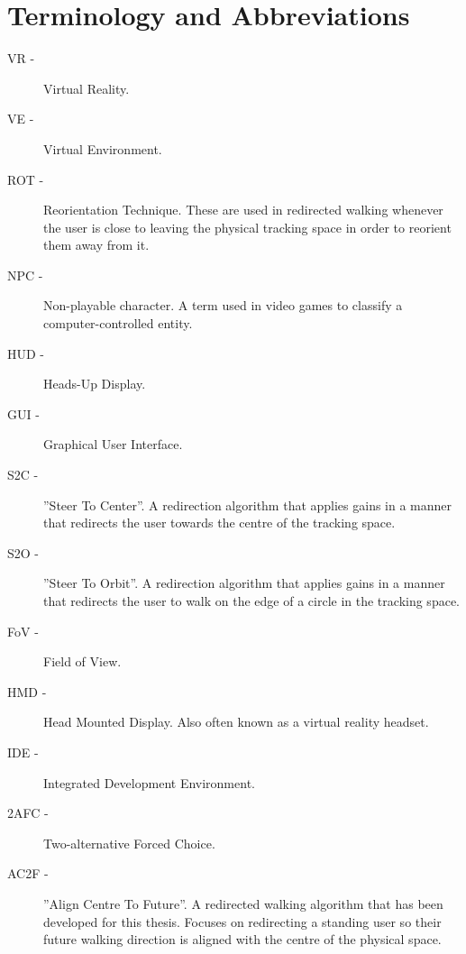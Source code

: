 \chapter{Terminology and Abbreviations}\label{app:terminology}

\begin{description}
\item[VR -] Virtual Reality.
\item[VE -] Virtual Environment.
\item[ROT -] Reorientation Technique. These are used in redirected walking whenever the user is close to leaving the physical tracking space in order to reorient them away from it. 
\item[NPC -] Non-playable character. A term used in video games to classify a computer-controlled entity.
\item[HUD -] Heads-Up Display.
\item[GUI -] Graphical User Interface.
\item[S2C -] ''Steer To Center''. A redirection algorithm that applies gains in a manner that redirects the user towards the centre of the tracking space.
\item[S2O -] ''Steer To Orbit''. A redirection algorithm that applies gains in a manner that redirects the user to walk on the edge of a circle in the tracking space.
\item[FoV -] Field of View.
\item[HMD -] Head Mounted Display. Also often known as a virtual reality headset.
\item[IDE -] Integrated Development Environment.
\item[2AFC - ] Two-alternative Forced Choice.
\item[AC2F - ] ''Align Centre To Future''. A redirected walking algorithm that has been developed for this thesis. Focuses on redirecting a standing user so their future walking direction is aligned with the centre of the physical space.
\end{description}